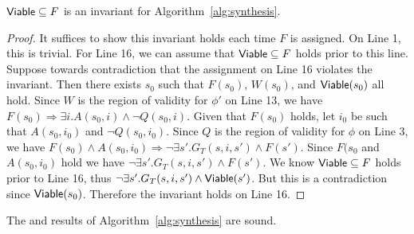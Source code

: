 \begin{lemma}
  ${\mathsf {Viable}} \subseteq F$ is an invariant for
  Algorithm~\ref{alg:synthesis}.
\label{lem:alg1-viable}
\end{lemma}

\begin{proof}
  It suffices to show this invariant holds each time $F$ is assigned.
  On Line 1, this is trivial. For Line 16, we can assume that
  ${\mathsf {Viable}} \subseteq F$ holds prior to this line. Suppose towards
  contradiction that the assignment on Line 16 violates the invariant.
  Then there exists $s_0$ such that $F(s_0)$, $W(s_0)$, and
  ${\mathsf {Viable}}(s_0)$ all hold. Since $W$ is the region of validity for
  $\phi'$ on Line 13, we have $F(s_0) \Rightarrow \exists i. A(s_0, i)
  \land \neg Q(s_0, i)$. Given that $F(s_0)$ holds, let $i_0$ be such
  that $A(s_0, i_0)$ and $\neg Q(s_0, i_0)$. Since $Q$ is the region
  of validity for $\phi$ on Line 3, we have $F(s_0) \land A(s_0, i_0)
  \Rightarrow \neg \exists s'. G_T(s, i, s') \land F(s')$. Since
  $F(s_0$ and $A(s_0, i_0)$ hold we have $\neg \exists s'. G_T(s, i,
  s') \land F(s')$. We know ${\mathsf {Viable}} \subseteq F$ holds prior to Line
  16, thus $\neg \exists s'. G_T(s, i, s') \land {\mathsf {Viable}}(s')$. But
  this is a contradiction since ${\mathsf {Viable}}(s_0)$. Therefore the
  invariant holds on Line 16.
\end{proof}


\begin{theorem}
  The \realizable and \unrealizable results of
  Algorithm~\ref{alg:synthesis} are sound.
\end{theorem}


